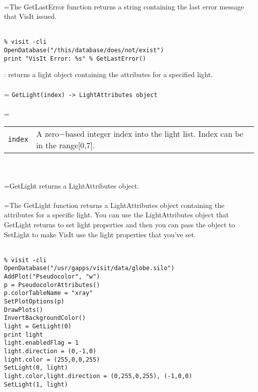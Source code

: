 \documentclass[10pt,a4paper]{report}
\begin{document}
 \\ 
\hangindent=\parindent The GetLastError function returns a string containing the last error message that VisIt issued. \\[-3mm] 

\\[-6mm]
\begin{verbatim}% visit -cli
OpenDatabase("/this/database/does/not/exist")
print "VisIt Error: %s" % GetLastError()
\end{verbatim}
\newpage


{}
: returns a light object containing the attributes for a specified light.\\[-3mm]

 \\ 
\hangindent=\parindent 
\verb!GetLight(index) -> LightAttributes object!\\ [-3mm]

 \\ 
\hangindent=\parindent 
\begin{tabular}{lp{9cm}}
\verb!index! & A zero$-$based integer index into the light list. Index can be in the range[0,7]. \\
\end{tabular} \\[-2mm]


 \\ 
\hangindent=\parindent GetLight returns a LightAttributes object. \\[-3mm] 

 \\ 
\hangindent=\parindent The GetLight function returns a LightAttributes object containing the attributes for a specific light. You can use the LightAttributes object that GetLight returns to set light properties and then you can pass the object to SetLight to make VisIt use the light properties that you've set. \\[-3mm] 

\\[-6mm]
\begin{verbatim}% visit -cli
OpenDatabase("/usr/gapps/visit/data/globe.silo")
AddPlot("Pseudocolor", "w")
p = PseudocolorAttributes()
p.colorTableName = "xray"
SetPlotOptions(p)
DrawPlots()
InvertBackgroundColor()
light = GetLight(0)
print light
light.enabledFlag = 1
light.direction = (0,-1,0)
light.color = (255,0,0,255)
SetLight(0, light)
light.color,light.direction = (0,255,0,255), (-1,0,0)
SetLight(1, light)
\end{verbatim}
\newpage
\end{document}
